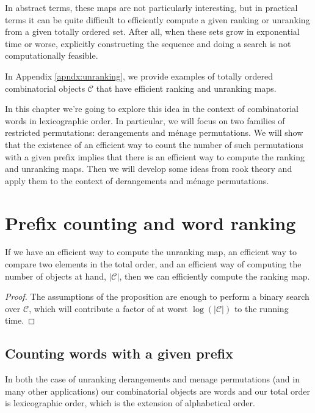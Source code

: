 In abstract terms, these maps are not particularly interesting, but in practical
terms it can be quite difficult to efficiently compute a given ranking or
unranking from a given totally ordered set. After all, when these sets
grow in exponential time or worse, explicitly constructing the sequence and
doing a search is not computationally feasible.

In Appendix \ref{apndx:unranking}, we provide examples of totally ordered
combinatorial objects $\mathcal{C}$ that have efficient ranking and unranking
maps.

In this chapter we're going to explore this idea in the context of combinatorial
words in lexicographic order. In particular, we will focus on two families of
restricted permutations: derangements and m\'enage permutations. We will show
that the existence of an efficient way to count the number of such permutations
with a given prefix implies that there is an efficient way to compute the
ranking and unranking maps. Then we will develop some ideas from rook theory
and apply them to the context of derangements and m\'enage permutations.
\section{Prefix counting and word ranking}


\begin{proposition}
  If we have
  an efficient way to compute the unranking map,
  an efficient way to compare two elements in the total order,
  and an efficient way of computing the number of objects at hand, $|\mathcal C|$,
  then we can efficiently compute the ranking map.
  \label{prop:unrankToRank}
\end{proposition}
\begin{proof}
  The assumptions of the proposition are enough to perform a binary search
  over $\mathcal C$, which will contribute a factor of at worst
  $\log(|\mathcal C|)$ to the running time.
\end{proof}

\subsection{Counting words with a given prefix}
In both the case of unranking derangements and menage permutations
(and in many other applications) our combinatorial objects are
words and our total order is lexicographic order, which is the extension of
alphabetical order.

